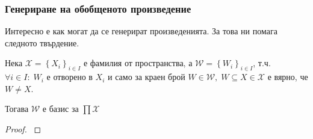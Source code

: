 \subsubsection{Генериране на обобщеното произведение}
Интересно е как могат да се генерират произведенията. За това ни помага следното твърдение.
\begin{proposition}
    Нека $\mathcal X = \left\{X_i\right\}_{i\in I}$ е фамилия от пространства, а $\mathcal W = \left\{W_i\right\}_{i\in I}$, т.ч. $\forall i\in I:\; W_i$ е отворено в $X_i$ и само за краен брой $W \in \mathcal W,\; W \subseteq X \in \mathcal X$ е вярно, че $W \neq X$.

    Тогава $\mathcal W$ е базис за $\prod \mathcal X$
\end{proposition}
\begin{proof}
    \cite[p.~77]{engelking1989general}
\end{proof}